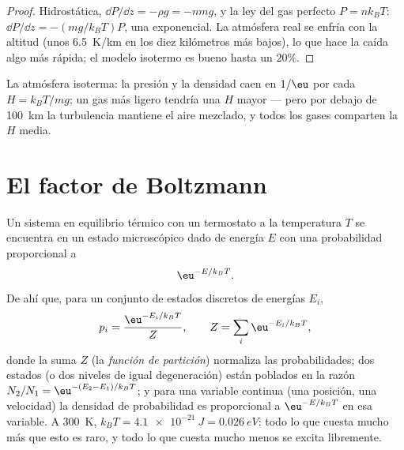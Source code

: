 \begin{proof}
Hidrostática, $\dd P/\dd z = -\rho g = -nmg$, y la ley del gas perfecto $P
= nk_BT$: $\dd P/\dd z = -(mg/k_BT)P$, una exponencial. La atmósfera
real se enfría con la altitud (unos \qty{6.5}{K/km} en los diez kilómetros
más bajos), lo que hace la caída algo más rápida; el modelo
isotermo es bueno hasta un $20\%$.
\end{proof}

\begin{omfigure}

{\small La atmósfera isoterma: la presión y la densidad caen en $1/\eu$
por cada  $H = k_BT/mg$; un gas más ligero tendría una $H$ mayor
--- pero por debajo de \qty{100}{km} la turbulencia mantiene el aire mezclado, y todos
los gases comparten la $H$ media.}
\end{omfigure}

\section{El factor de Boltzmann}

\begin{theorem}\label{thm:b2:boltzmann-factor:factor}
Un sistema en equilibrio térmico con un termostato a la temperatura
$T$ se encuentra en un estado microscópico dado de energía $E$ con una
probabilidad proporcional a
\[
\eu^{-E/k_BT} .
\]
De ahí que, para un conjunto de estados discretos de energías $E_i$,
\[
p_i = \frac{\eu^{-E_i/k_BT}}{Z}, \qquad Z = \sum_i\eu^{-E_i/k_BT} ,
\]
donde la suma $Z$ (la \emph{función de partición})
normaliza las probabilidades; dos estados (o dos niveles de igual
degeneración) están poblados en la razón $N_2/N_1 = \eu^{-(E_2 - E_1)/k_BT}$;
y para una variable continua (una posición, una velocidad) la densidad de
probabilidad es proporcional a $\eu^{-E/k_BT}$ en esa variable. A
\qty{300}{K}, $k_BT = \qty{4.1e-21}{J} = \qty{0.026}{eV}$: todo lo que
cuesta mucho más que esto es raro, y todo lo que cuesta mucho menos se excita
libremente.
\end{theorem}

